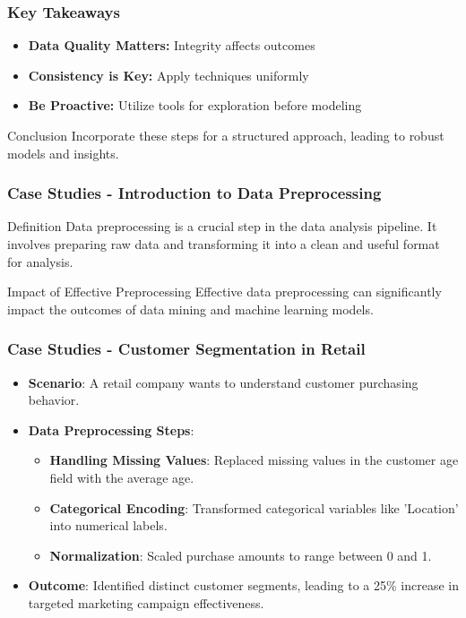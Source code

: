 \documentclass[aspectratio=169]{beamer}
\begin{document}
\begin{frame}[fragile]
    \frametitle{Key Takeaways}
    \begin{itemize}
        \item \textbf{Data Quality Matters:} Integrity affects outcomes
        \item \textbf{Consistency is Key:} Apply techniques uniformly
        \item \textbf{Be Proactive:} Utilize tools for exploration before modeling
    \end{itemize}
    \begin{block}{Conclusion}
        Incorporate these steps for a structured approach, leading to robust models and insights.
    \end{block}
\end{frame}

\begin{frame}[fragile]
    \frametitle{Case Studies - Introduction to Data Preprocessing}
    \begin{block}{Definition}
        Data preprocessing is a crucial step in the data analysis pipeline. It involves preparing raw data and transforming it into a clean and useful format for analysis.
    \end{block}
    
    \begin{block}{Impact of Effective Preprocessing}
        Effective data preprocessing can significantly impact the outcomes of data mining and machine learning models.
    \end{block}
\end{frame}

\begin{frame}[fragile]
    \frametitle{Case Studies - Customer Segmentation in Retail}
    \begin{itemize}
        \item \textbf{Scenario}: A retail company wants to understand customer purchasing behavior.
        \item \textbf{Data Preprocessing Steps}:
            \begin{itemize}
                \item \textbf{Handling Missing Values}: Replaced missing values in the customer age field with the average age.
                \item \textbf{Categorical Encoding}: Transformed categorical variables like 'Location' into numerical labels.
                \item \textbf{Normalization}: Scaled purchase amounts to range between 0 and 1.
            \end{itemize}
        \item \textbf{Outcome}: Identified distinct customer segments, leading to a 25\% increase in targeted marketing campaign effectiveness.
    \end{itemize}
\end{frame}
\end{document}
